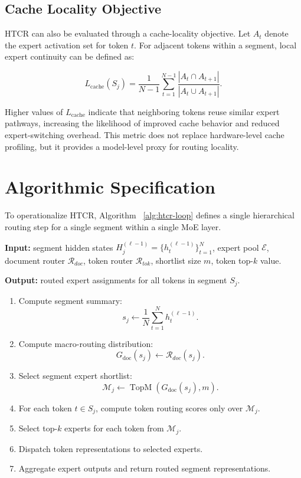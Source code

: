 \section{Cache Locality Objective}

HTCR can also be evaluated through a cache-locality objective. Let $A_t$ denote the expert activation set for token $t$. For adjacent tokens within a segment, local expert continuity can be defined as:

\begin{equation}
L_{\text{cache}}(S_j)
=
\frac{1}{N-1}
\sum_{t=1}^{N-1}
\frac{|A_t \cap A_{t+1}|}
{|A_t \cup A_{t+1}|}.
\end{equation}

Higher values of $L_{\text{cache}}$ indicate that neighboring tokens reuse similar expert pathways, increasing the likelihood of improved cache behavior and reduced expert-switching overhead. This metric does not replace hardware-level cache profiling, but it provides a model-level proxy for routing locality.

\chapter{Algorithmic Specification}

To operationalize HTCR, Algorithm ~\ref{alg:htcr-loop} defines a single hierarchical routing step for a single segment within a single MoE layer.

\begin{algorithm}[H] 
    \caption{Hierarchical Topic-Conditioned Routing Loop}
    \label{alg:htcr-loop}

    \smallskip
    \textbf{Input:} segment hidden states $H_j^{(\ell-1)} = \{h_t^{(\ell-1)}\}_{t=1}^{N}$, expert pool $\mathcal{E}$, document router $\mathcal{R}_{doc}$, token router $\mathcal{R}_{tok}$, shortlist size $m$, token top-$k$ value.
    
    \textbf{Output:} routed expert assignments for all tokens in segment $S_j$.
    \smallskip

    \begin{enumerate}
        \item Compute segment summary:
        \[
        s_j \leftarrow \frac{1}{N}\sum_{t=1}^{N} h_t^{(\ell-1)}.
        \]
        \item Compute macro-routing distribution:
        \[
        G_{\text{doc}}(s_j) \leftarrow \mathcal{R}_{doc}(s_j).
        \]
        \item Select segment expert shortlist:
        \[
        \mathcal{M}_j \leftarrow \operatorname{TopM}(G_{\text{doc}}(s_j),m).
        \]
        \item For each token $t \in S_j$, compute token routing scores only over $\mathcal{M}_j$.
        \item Select top-$k$ experts for each token from $\mathcal{M}_j$.
        \item Dispatch token representations to selected experts.
        \item Aggregate expert outputs and return routed segment representations.
    \end{enumerate}
\end{algorithm}


